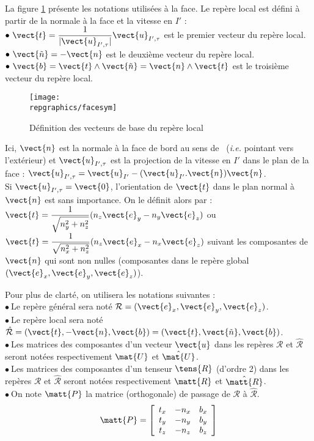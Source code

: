 La figure \ref{Base_Clsyvt_fig_facesym} pr\'esente les notations utilis\'ees \`a la face. Le
rep\`ere local est d\'efini \`a partir de la normale \`a la face et la vitesse
en $I'$ :\\
$\bullet\ \displaystyle\vect{t}
=\frac{1}{|\vect{u}_{I',\tau}|}\vect{u}_{I',\tau}$ est le
premier vecteur du rep\`ere local.\\
$\bullet\ \vect{\tilde{n}}=-\vect{n}$ est le deuxi\`eme vecteur du rep\`ere
local.\\
$\bullet\ \vect{b}=\vect{t}\wedge\vect{\tilde{n}}=\vect{n}\wedge\vect{t}$ est le
troisi\`eme vecteur du rep\`ere local.

\begin{figure}[h]
\centerline{\texttt{[image: \\repgraphics/facesym]}}
\caption{\label{Base_Clsyvt_fig_facesym}D\'efinition des vecteurs de base du rep\`ere local}
\end{figure}

Ici, $\vect{n}$ est la normale \`a la face de bord au sens de \CS\ ({\em i.e.}
pointant vers l'ext\'erieur) et $\vect{u}_{I',\tau}$ est la projection de la
vitesse en $I'$ dans le plan de la face :
$\vect{u}_{I',\tau}=\vect{u}_{I'}-(\vect{u}_{I'}.\vect{n})\vect{n}$.\\
Si $\vect{u}_{I',\tau}=\vect{0}$, l'orientation de $\vect{t}$ dans le plan
normal \`a $\vect{n}$ est sans importance. On le d\'efinit alors par :
$\displaystyle\vect{t}=\frac{1}{\sqrt{n_y^2+n_z^2}}(n_z\vect{e}_y-n_y\vect{e}_z)$
ou
$\displaystyle\vect{t}=\frac{1}{\sqrt{n_x^2+n_z^2}}(n_z\vect{e}_x-n_x\vect{e}_z)$
suivant les composantes de $\vect{n}$ qui sont non nulles (composantes dans le
rep\`ere global $(\vect{e}_x,\vect{e}_y,\vect{e}_z)$).


Pour plus de clart\'e, on utilisera les notations suivantes :\\
$\bullet\ $Le rep\`ere g\'en\'eral sera not\'e
$\mathcal{R}=(\vect{e}_x,\vect{e}_y,\vect{e}_z)$.\\
$\bullet\ $Le rep\`ere local sera not\'e
$\hat{\mathcal{R}}=(\vect{t},-\vect{n},\vect{b})=(\vect{t},\vect{\tilde{n}},\vect{b})$.\\
$\bullet\ $Les matrices des composantes d'un vecteur $\vect{u}$ dans les rep\`eres
$\mathcal{R}$ et $\hat{\mathcal{R}}$ seront not\'ees respectivement
$\mat{U}$ et $\hat{\mat{U}}$.\\
$\bullet\ $Les matrices des composantes d'un tenseur $\tens{R}$ (d'ordre 2) dans
les rep\`eres $\mathcal{R}$ et $\hat{\mathcal{R}}$ seront not\'ees
respectivement $\matt{R}$ et $\hat{\matt{R}}$.\\
$\bullet\ $On note $\matt{P}$ la matrice (orthogonale) de passage de $\mathcal{R}$ \`a
$\hat{\mathcal{R}}$.
\begin{equation}
\matt{P}=\left[
\begin{array}{ccc}
t_x & -n_x & b_x\\
t_y & -n_y & b_y\\
t_z & -n_z & b_z
\end{array}\right]
\end{equation}

